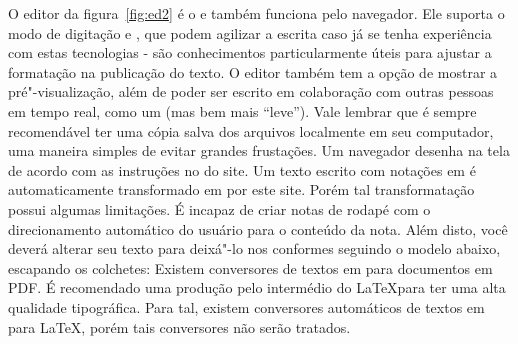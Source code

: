 {}O editor da figura~\ref{fig:ed2} é o  e também funciona pelo navegador. Ele suporta o modo de digitação  e , que podem agilizar a escrita caso já se tenha experiência com estas tecnologias - são conhecimentos particularmente úteis para ajustar a formatação na publicação do texto. O editor também tem a opção de mostrar a pré"-visualização, além de poder ser escrito em colaboração com outras pessoas em tempo real, como um  (mas bem mais \textquotedblleft leve\textquotedblright{}). Vale lembrar que é sempre recomendável ter uma cópia salva dos arquivos  localmente em seu computador, uma maneira simples de evitar grandes frustações.\markdownRendererInterblockSeparator
{}\markdownRendererInterblockSeparator
{}\markdownRendererInterblockSeparator
{}Um navegador desenha na tela de acordo com as instruções no  do site. Um texto escrito com notações em  é automaticamente transformado em  por este site. Porém tal transformatação possui algumas limitações.\markdownRendererInterblockSeparator
{}É incapaz de criar notas de rodapé com o direcionamento automático do usuário para o conteúdo da nota. Além disto, você deverá alterar seu texto para deixá"-lo nos conformes seguindo o modelo abaixo, escapando os colchetes:\markdownRendererInterblockSeparator
{}\markdownRendererInterblockSeparator
{}\markdownRendererInterblockSeparator
{}Existem conversores de textos em  para documentos em PDF. É recomendado uma produção pelo intermédio do \LaTeX para ter uma alta qualidade tipográfica. Para tal, existem conversores automáticos de textos em  para \LaTeX, porém tais conversores não serão tratados.\fimsubsubsec\markdownRendererInterblockSeparator
{}\markdownRendererInterblockSeparator
